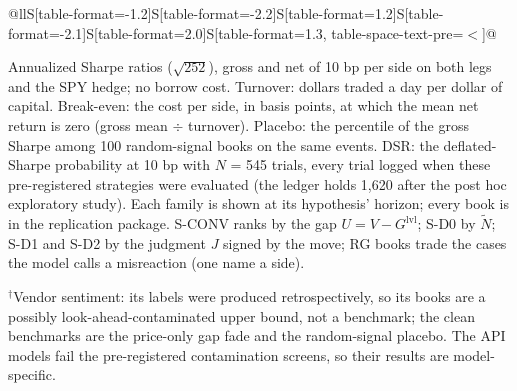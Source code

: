 \begin{table}[htbp]
\begin{threeparttable}
\begin{tabular}{@{}llS[table-format=-1.2]S[table-format=-2.2]S[table-format=1.2]S[table-format=-2.1]S[table-format=2.0]S[table-format=1.3, table-space-text-pre={$<$}]@{}}
\bottomrule
\end{tabular}
\begin{tablenotes}[flushleft]\footnotesize
\item Annualized Sharpe ratios ($\sqrt{252}$), gross and net of 10 bp per side on both legs and the SPY hedge; no borrow cost. Turnover: dollars traded a day per dollar of capital. Break-even: the cost per side, in basis points, at which the mean net return is zero (gross mean $\div$ turnover). Placebo: the percentile of the gross Sharpe among 100 random-signal books on the same events. DSR: the deflated-Sharpe probability at 10 bp with $N$ = 545 trials, every trial logged when these pre-registered strategies were evaluated (the ledger holds 1,620 after the post hoc exploratory study). Each family is shown at its hypothesis' horizon; every book is in the replication package. S-CONV ranks by the gap $U = V - G^{\mathrm{lvl}}$; S-D0 by $\tilde N$; S-D1 and S-D2 by the judgment $J$ signed by the move; RG books trade the cases the model calls a misreaction (one name a side).
\item $^{\dagger}$Vendor sentiment: its labels were produced retrospectively, so its books are a possibly look-ahead-contaminated upper bound, not a benchmark; the clean benchmarks are the price-only gap fade and the random-signal placebo. The API models fail the pre-registered contamination screens, so their results are model-specific.
\end{tablenotes}
\end{threeparttable}
\end{table}
